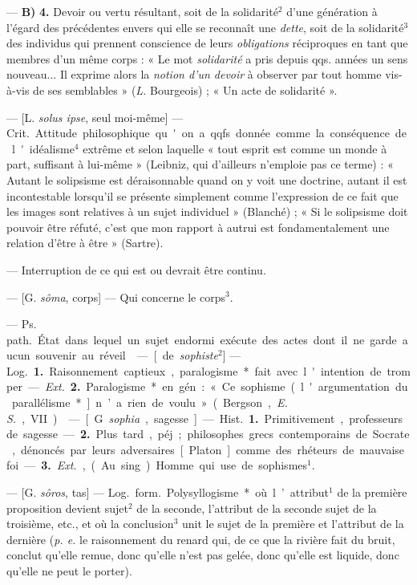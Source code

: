 \begin{itemize}[leftmargin=1cm, label=, itemsep=1pt]
— {\bf B)}  {\bf 4.} Devoir ou vertu résultant, soit de la
solidarité$^2$ d’une génération à l'égard des précédentes envers qui elle se
reconnaît une {\it dette}, soit de la solidarité$^3$ des individus qui
prennent conscience de leurs {\it obligations} réciproques en tant que
membres d’un même corps : « Le mot {\it solidarité} a pris depuis qqs. années
un sens nouveau... Il exprime alors la {\it notion d’un devoir} à observer
par tout homme vis-à-vis de ses semblables » ({\it L.} Bourgeois) ; « Un acte
de solidarité ».

 — [L. {\it solus ipse}, seul moi-même] — \si{Crit.} Attitude
philosophique qu'on a qqfs. donnée comme la conséquence de l'idéalisme$^4$
extrême et selon laquelle « tout esprit est comme un monde à part, suffisant
à lui-même » (Leibniz, qui d’ailleurs n’emploie pas ce terme) : « Autant le
solipsisme est déraisonnable quand on y voit une doctrine, autant il est
incontestable lorsqu'il se présente simplement comme l'expression de ce fait
que les images sont relatives à un sujet individuel » (Blanché) ; « Si le
solipsisme doit pouvoir être réfuté, c'est que mon rapport à autrui est
fondamentalement une relation d’être à être » (Sartre).

 — Interruption
de ce qui est ou devrait être continu.

 — [G. {\it sôma}, corps] — Qui concerne le corps$^3$.

 — \si{Ps. path.} État dans lequel un sujet endormi exécute
des actes dont il ne garde aucun souvenir au réveil.

 — [de {\it sophiste}$^2$] — \si{Log.} {\bf 1.} Raisonnement
captieux, paralogisme*
fait avec l'intention de tromper. — {\it Ext.} {\bf 2.} Paralogisme* en
gén. : « Ce sophisme (l'argumentation du parallélisme*] n’a rien de voulu
» (Bergson, {\it E. S.}, VII).

 — [G. {\it sophia}, sagesse] — \si{Hist.} {\bf 1.} Primitivement,
professeurs de sagesse. — {\bf 2.} Plus tard., péj. ; philosophes grecs
contemporains de Socrate, dénoncés par leurs adversaires [Platon] comme des
rhéteurs de mauvaise foi. — {\bf 3.} {\it Ext.}, (Au sing.) Homme qui use de
sophismes$^1$.

 — [G. {\it sôros}, tas] — \si{Log.} \si{form.} Polysyllogisme* où
l’attribut$^1$ de la première proposition devient sujet$^2$ de la seconde,
l’attribut de la seconde sujet de la troisième, etc., et où la conclusion$^3$
unit le sujet de la première et l’attribut de la dernière ({\it p. e.} le
raisonnement du renard qui, de ce que la rivière fait du bruit, conclut
qu’elle remue, donc qu’elle n’est pas gelée, donc qu’elle est liquide, donc
qu'elle ne peut le porter).


\end{itemize}
